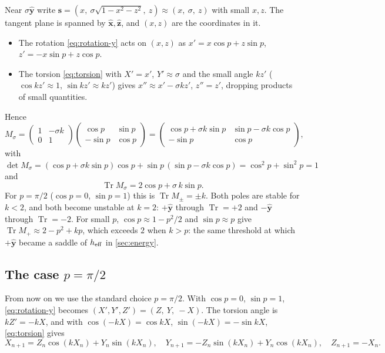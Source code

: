 \documentclass[11pt,a4paper]{article}
\newcommand{\vs}{\bm{s}}
\newcommand{\Tr}{\operatorname{Tr}}
\begin{document}
Near $\sigma\hat{\bm y}$ write $\vs = (x,\ \sigma\sqrt{1-x^2-z^2},\ z) \approx (x,\ \sigma,\ z)$ with small $x, z$. The
tangent plane is spanned by $\hat{\bm x}, \hat{\bm z}$, and $(x, z)$ are the coordinates in it.
\begin{itemize}
  \item The rotation \eqref{eq:rotation-y} acts on $(x,z)$ as $x' = x\cos p + z\sin p$, $z' = -x\sin p + z\cos p$.
  \item The torsion \eqref{eq:torsion} with $X' = x'$, $Y' \approx \sigma$ and the small angle $kz'$
  ($\cos kz'\approx1$, $\sin kz'\approx kz'$) gives $x'' \approx x' - \sigma kz'$, $z'' = z'$, dropping products of small
  quantities.
\end{itemize}
Hence
\begin{equation}
  M_\sigma = \begin{pmatrix}1 & -\sigma k\\ 0 & 1\end{pmatrix}\begin{pmatrix}\cos p & \sin p\\ -\sin p & \cos p\end{pmatrix}
           = \begin{pmatrix} \cos p + \sigma k \sin p & \sin p - \sigma k\cos p\\ -\sin p & \cos p\end{pmatrix},
\end{equation}
with $\det M_\sigma = (\cos p + \sigma k\sin p)\cos p + \sin p\,(\sin p - \sigma k\cos p) = \cos^2p + \sin^2p = 1$ and
\begin{equation}\label{eq:pole-trace}
  \boxed{\Tr M_\sigma = 2\cos p + \sigma\, k \sin p .}
\end{equation}
For $p = \pi/2$ ($\cos p = 0$, $\sin p = 1$) this is $\Tr M_\pm = \pm k$. Both poles are stable for $k<2$, and both
become unstable at $k = 2$: $+\hat{\bm y}$ through $\Tr = +2$ and $-\hat{\bm y}$ through $\Tr = -2$. For small $p$,
$\cos p \approx 1 - p^2/2$ and $\sin p \approx p$ give $\Tr M_+ \approx 2 - p^2 + kp$, which exceeds $2$ when $k > p$:
the same threshold at which $+\hat{\bm y}$ became a saddle of $h_{\rm eff}$ in \cref{sec:energy}.

\subsection{The case \texorpdfstring{$p = \pi/2$}{p = pi/2}}\label{sec:pi2}

From now on we use the standard choice $p = \pi/2$. With $\cos p = 0$, $\sin p = 1$, \eqref{eq:rotation-y} becomes
$(X', Y', Z') = (Z,\ Y,\ -X)$. The torsion angle is $kZ' = -kX$, and with $\cos(-kX) = \cos kX$, $\sin(-kX) = -\sin
kX$, \eqref{eq:torsion} gives
\begin{equation}\label{eq:map-pi2}
  X_{n+1} = Z_n\cos(kX_n) + Y_n\sin(kX_n), \quad
  Y_{n+1} = -Z_n\sin(kX_n) + Y_n\cos(kX_n), \quad
  Z_{n+1} = -X_n .
\end{equation}
\end{document}
